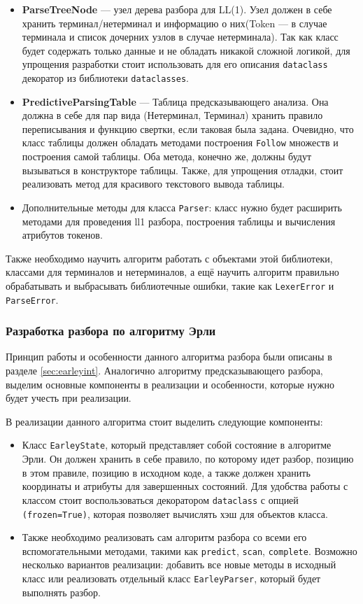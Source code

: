 \documentclass[14pt, russian]{scrartcl}
\begin{document}
\begin{itemize}
	\item \textbf{ParseTreeNode} --- узел дерева разбора для LL(1). Узел должен в себе хранить терминал/нетерминал
	и информацию о них(Token --- в случае терминала и список дочерних узлов в случае нетерминала). Так как класс будет
	содержать только данные и не обладать никакой сложной логикой, для упрощения разработки стоит использовать для его
	описания \texttt{dataclass} декоратор из библиотеки \texttt{dataclasses}.
	\item \textbf{PredictiveParsingTable} --- Таблица предсказывающего анализа. Она должна в себе для пар вида
	(Нетерминал, Терминал) хранить правило переписывания и функцию свертки, если таковая была задана. Очевидно,
	что класс таблицы должен обладать методами построения \texttt{Follow} множеств и построения самой таблицы.
	Оба метода, конечно же, должны будут вызываться в конструкторе таблицы. Также, для упрощения отладки, стоит
	реализовать метод для красивого текстового вывода таблицы.
	\item Дополнительные методы для класса \texttt{Parser}: класс нужно будет расширить методами для проведения ll1 разбора,
	построения таблицы и вычисления атрибутов токенов.
\end{itemize}

Также необходимо научить алгоритм работать с объектами этой библиотеки, классами для терминалов и нетерминалов, а ещё
научить алгоритм правильно обрабатывать и выбрасывать библиотечные ошибки, такие как \texttt{LexerError} и \texttt{ParseError}.

\subsubsection{Разработка разбора по алгоритму Эрли}

Принцип работы и особенности данного алгоритма разбора были описаны в разделе \ref{sec:earleyint}. Аналогично
алгоритму предсказывающего разбора, выделим основные компоненты в реализации и особенности, которые нужно будет учесть
при реализации.

В реализации данного алгоритма стоит выделить следующие компоненты:

\begin{itemize}
	\item Класс \texttt{EarleyState}, который представляет собой состояние в алгоритме Эрли. Он должен хранить в себе
	правило, по которому идет разбор, позицию в этом правиле, позицию в исходном коде, а также должен хранить
	координаты и атрибуты для завершенных состояний. Для удобства работы с классом стоит воспользоваться декоратором
	\texttt{dataclass} с опцией \texttt{(frozen=True)}, которая позволяет вычислять хэш для объектов класса.
	\item Также необходимо реализовать сам алгоритм разбора со всеми его вспомогательными методами, такими как
	\texttt{predict}, \texttt{scan}, \texttt{complete}. Возможно несколько вариантов реализации:
	добавить все новые методы в исходный класс или реализовать отдельный класс \texttt{EarleyParser}, который будет
	выполнять разбор.
\end{itemize}
\end{document}
